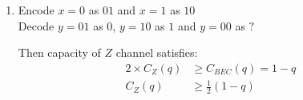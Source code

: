 \documentclass[12pt, a4paper]{article}
\begin{document}
\begin{enumerate}
\begin{enumerate}
      \item Calculate conditional entropy,
        \begin{align*}
          H(Y|X) &= H(Y,E|X)\\ 
                 &= H(E|X) + H(Y|E, X)\\ 
                 &= H_2(\epsilon) + (1-\epsilon)H_2(\delta)
        \end{align*}
        and entropy,
        \begin{align*}
          H(Y) &= H(Y,E)\\ 
               &= H(E) + H(Y|E)\\ 
               &= H_2(\epsilon) + (1-\epsilon)H_2(\delta + p - 2p\delta)
               &\leq H_2(\epsilon) + (1-\epsilon),\quad\text{when $p=\frac{1}{2}$}
        \end{align*}
        Hence, the capacity is:
        \begin{align*}
          C &= \max_{P_X}I(X;Y)\\ 
            &= \max_{p}H(Y) - H(Y|X)\\ 
            &= H_2(\epsilon) + (1-\epsilon) - H_2(\epsilon) - (1-\epsilon)H_2(\delta)\\
            &= (1-\epsilon)(1-H_2(\delta))
        \end{align*}
    \end{enumerate}

  \pagebreak
  \item Encode $x=0$ as $01$ and $x=1$ as $10$\\ 
    Decode $y=01$ as $0$, $y=10$ as $1$ and $y = 00$ as $?$

    Then capacity of $Z$ channel satisfies:
    \begin{align*}
      2 \times C_Z(q) &\geq C_{BEC}(q) = 1-q\\
      C_Z(q) &\geq \frac{1}{2}(1-q)
    \end{align*}


\end{enumerate}
\end{document}
